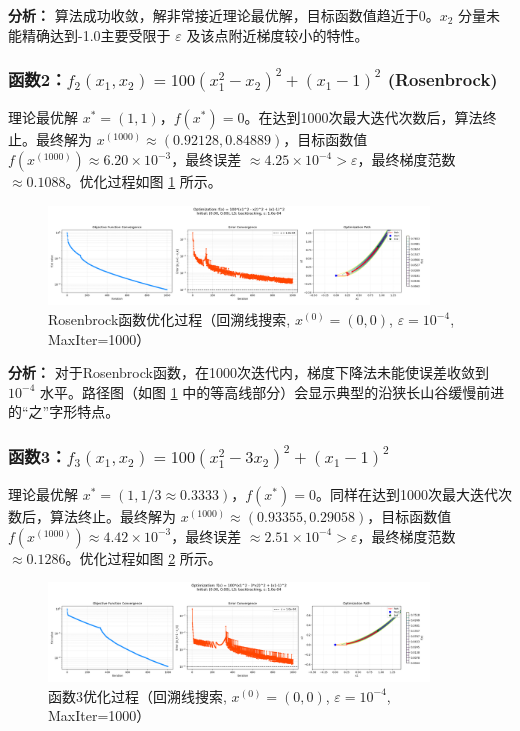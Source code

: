 \documentclass[12pt]{article} %
\begin{document}
\textbf{分析：} 算法成功收敛，解非常接近理论最优解，目标函数值趋近于0。\(x_2\) 分量未能精确达到-1.0主要受限于 \(\varepsilon\) 及该点附近梯度较小的特性。

\subsubsection{函数2：\(f_2(x_1, x_2) = 100(x_1^2-x_2)^2 + (x_1-1)^2\) (Rosenbrock)}
理论最优解 \(x^*=(1, 1)\)，\(f(x^*)=0\)。在达到1000次最大迭代次数后，算法终止。最终解为 \(x^{(1000)} \approx (0.92128, 0.84889)\)，目标函数值 \(f(x^{(1000)}) \approx 6.20 \times 10^{-3}\)，最终误差 \(\approx 4.25 \times 10^{-4} > \varepsilon\)，最终梯度范数 \(\approx 0.1088\)。优化过程如图 \ref{fig:f2_results_actual} 所示。

\begin{figure}[H]
  \centering
  \includegraphics[width=0.9\textwidth]{../fig/opt_F2_x0_0p0_0p0_LS_backtracking_20250524-211825.png}

  \caption{Rosenbrock函数优化过程（回溯线搜索, \(x^{(0)}=(0,0)\), \(\varepsilon=10^{-4}\), MaxIter=1000）}
  \label{fig:f2_results_actual}
\end{figure}

\textbf{分析：} 对于Rosenbrock函数，在1000次迭代内，梯度下降法未能使误差收敛到 \(10^{-4}\) 水平。路径图（如图 \ref{fig:f2_results_actual} 中的等高线部分）会显示典型的沿狭长山谷缓慢前进的“之”字形特点。

\subsubsection{函数3：\(f_3(x_1, x_2) = 100(x_1^2-3x_2)^2 + (x_1-1)^2\)}
理论最优解 \(x^*=(1, 1/3 \approx 0.3333)\)，\(f(x^*)=0\)。同样在达到1000次最大迭代次数后，算法终止。最终解为 \(x^{(1000)} \approx (0.93355, 0.29058)\)，目标函数值 \(f(x^{(1000)}) \approx 4.42 \times 10^{-3}\)，最终误差 \(\approx 2.51 \times 10^{-4} > \varepsilon\)，最终梯度范数 \(\approx 0.1286\)。优化过程如图 \ref{fig:f3_results_actual} 所示。

\begin{figure}[H]
  \centering
  \includegraphics[width=0.9\textwidth]{../fig/opt_F3_x0_0p0_0p0_LS_backtracking_20250524-211846.png}
  
  \caption{函数3优化过程（回溯线搜索, \(x^{(0)}=(0,0)\), \(\varepsilon=10^{-4}\), MaxIter=1000）}
  \label{fig:f3_results_actual}
\end{figure}
\end{document}
